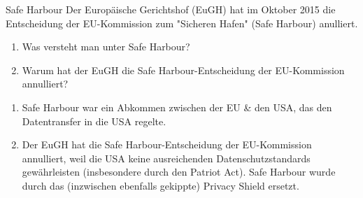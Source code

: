 \documentclass{article}
\begin{document}
\begin{exercise}{Safe Harbour}
  Der Europäische Gerichtshof (EuGH) hat im Oktober 2015 die Entscheidung der EU-Kommission zum "Sicheren Hafen" (Safe Harbour) anulliert.
  \begin{enumerate}
    \item Was versteht man unter Safe Harbour?
    \item Warum hat der EuGH die Safe Harbour-Entscheidung der EU-Kommission annulliert?
  \end{enumerate}

  \begin{solution}
    \begin{enumerate}
      \item Safe Harbour war ein Abkommen zwischen der EU \& den USA, das den Datentransfer in die USA regelte.
      \item Der EuGH hat die Safe Harbour-Entscheidung der EU-Kommission annulliert, weil die USA keine ausreichenden Datenschutzstandards gewährleisten (insbesondere durch den Patriot Act). Safe Harbour wurde durch das (inzwischen ebenfalls gekippte) Privacy Shield ersetzt.
    \end{enumerate}
  \end{solution}
\end{exercise}
\end{document}
